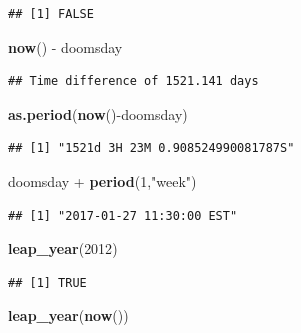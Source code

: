 \documentclass[]{tufte-book}
\newenvironment{Shaded}{}{}
\newcommand{\DecValTok}[1]{\textcolor[rgb]{0.25,0.63,0.44}{#1}}
\newcommand{\KeywordTok}[1]{\textcolor[rgb]{0.00,0.44,0.13}{\textbf{#1}}}
\newcommand{\NormalTok}[1]{#1}
\newcommand{\OperatorTok}[1]{\textcolor[rgb]{0.40,0.40,0.40}{#1}}
\newcommand{\StringTok}[1]{\textcolor[rgb]{0.25,0.44,0.63}{#1}}
\begin{document}
\begin{verbatim}
## [1] FALSE
\end{verbatim}

\begin{Shaded}
\begin{Highlighting}[]
\KeywordTok{now}\NormalTok{() }\OperatorTok{-}\StringTok{ }\NormalTok{doomsday}
\end{Highlighting}
\end{Shaded}

\begin{verbatim}
## Time difference of 1521.141 days
\end{verbatim}

\begin{Shaded}
\begin{Highlighting}[]
\KeywordTok{as.period}\NormalTok{(}\KeywordTok{now}\NormalTok{()}\OperatorTok{-}\NormalTok{doomsday)}
\end{Highlighting}
\end{Shaded}

\begin{verbatim}
## [1] "1521d 3H 23M 0.908524990081787S"
\end{verbatim}

\begin{Shaded}
\begin{Highlighting}[]
\NormalTok{doomsday }\OperatorTok{+}\StringTok{ }\KeywordTok{period}\NormalTok{(}\DecValTok{1}\NormalTok{,}\StringTok{"week"}\NormalTok{)}
\end{Highlighting}
\end{Shaded}

\begin{verbatim}
## [1] "2017-01-27 11:30:00 EST"
\end{verbatim}

\begin{Shaded}
\begin{Highlighting}[]
\KeywordTok{leap_year}\NormalTok{(}\DecValTok{2012}\NormalTok{)}
\end{Highlighting}
\end{Shaded}

\begin{verbatim}
## [1] TRUE
\end{verbatim}

\begin{Shaded}
\begin{Highlighting}[]
\KeywordTok{leap_year}\NormalTok{(}\KeywordTok{now}\NormalTok{())}
\end{Highlighting}
\end{Shaded}
\end{document}
